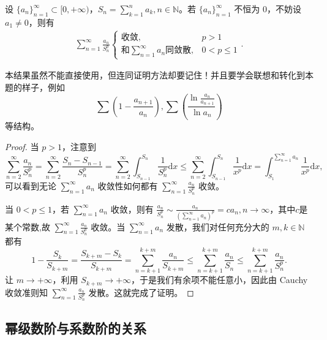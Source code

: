 \documentclass[../../main.tex]{subfiles}
\begin{document}
\begin{proposition}\label{proposition:部分和相关级数重要性质}
设 \( \{a_n\}_{n = 1}^{\infty} \subset [0, +\infty) \)，\( S_n = \sum_{k = 1}^{n} a_k, n \in \mathbb{N} \)。若 \( \{a_n\}_{n = 1}^{\infty} \) 不恒为 0，不妨设 \( a_1 \neq 0 \)，则有
\begin{align*}
\sum_{n = 1}^{\infty} \frac{a_n}{S_n^p}
\begin{cases} 
\text{收敛}, & p > 1 \\
\text{和} \sum_{n = 1}^{\infty} a_n \text{同敛散}, & 0 < p \leqslant 1 
\end{cases}. 
\end{align*}
\end{proposition}
\begin{note}
本结果虽然不能直接使用，但连同证明方法却要记住！并且要学会联想和转化到本题的样子，例如
\[
\sum \left( 1 - \frac{a_{n + 1}}{a_n} \right), \sum \left( \frac{\ln \frac{a_n}{a_{n + 1}}}{\ln a_n} \right)
\]
等结构。
\end{note}
\begin{proof}
当 \( p > 1 \)，注意到
\[
\sum_{n = 2}^{\infty} \frac{a_n}{S_n^p} = \sum_{n = 2}^{\infty} \frac{S_n - S_{n - 1}}{S_n^p} = \sum_{n = 2}^{\infty} \int_{S_{n - 1}}^{S_n} \frac{1}{S_n^p} \mathrm{d}x \leqslant \sum_{n = 2}^{\infty} \int_{S_{n - 1}}^{S_n} \frac{1}{x^p} \mathrm{d}x = \int_{S_1}^{\sum\limits_{n = 1}^{\infty} a_n} \frac{1}{x^p} \mathrm{d}x,
\]
可以看到无论 \( \sum_{n = 1}^{\infty} a_n \) 收敛性如何都有 \( \sum_{n = 1}^{\infty} \frac{a_n}{S_n^p} \) 收敛。

当 \( 0 < p \leqslant 1 \)，若 \( \sum_{n = 1}^{\infty} a_n \) 收敛，则有 \( \frac{a_n}{S_n^p} \sim \frac{a_n}{\left( \sum\limits_{n = 1}^{\infty} a_n \right)^p}=ca_n, n \to \infty \)，其中$c$是某个常数,故 \( \sum_{n = 1}^{\infty} \frac{a_n}{S_n^p} \) 收敛。当 \( \sum_{n = 1}^{\infty} a_n \) 发散，我们对任何充分大的 \( m, k \in \mathbb{N} \) 都有
\[
1 - \frac{S_k}{S_{k + m}} = \frac{S_{k + m} - S_k}{S_{k + m}} = \sum_{n = k + 1}^{k + m} \frac{a_n}{S_{k + m}} \leqslant \sum_{n = k + 1}^{k + m} \frac{a_n}{S_n} \leqslant \sum_{n = k + 1}^{k + m} \frac{a_n}{S_n^p}.
\]
让 \( m \to +\infty \)，利用 \( S_{k + m} \to +\infty \)，于是我们有余项不能任意小，因此由 Cauchy 收敛准则知 \( \sum_{n = 1}^{\infty} \frac{a_n}{S_n^p} \) 发散。这就完成了证明。
\end{proof}

\subsection{幂级数阶与系数阶的关系}
\end{document}
